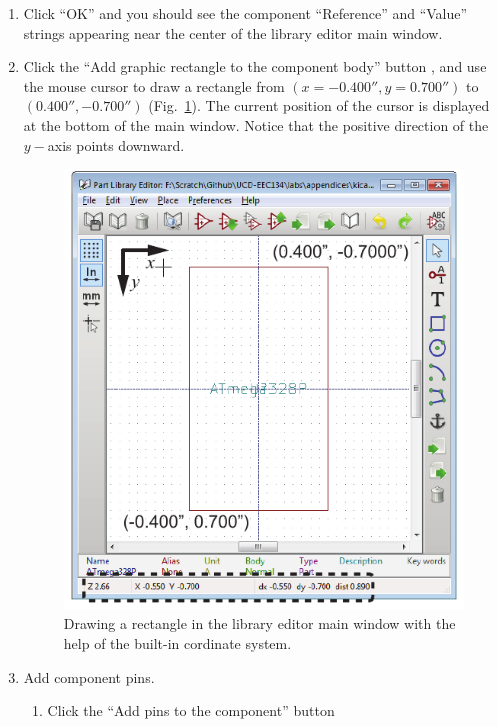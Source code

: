\documentclass[12pt,letterpaper]{scrartcl}
\begin{document}
\begin{enumerate}
	\item Click ``OK'' and you should see the component ``Reference'' and ``Value'' strings appearing near the center of the library editor main window. 
	
	\item Click the ``Add graphic rectangle to the component body'' button , and use the mouse cursor to draw a rectangle from $(x=-0.400'', y=0.700'')$ to $(0.400'',-0.700'')$ (Fig.~\ref{fig:draw-rectangle-symbol}). The current position of the cursor is displayed at the bottom of the main window. Notice that the positive direction of the $y-$axis points downward. 
		\begin{figure}[p]
			\centering
			\includegraphics{draw-rectangle-symbol.pdf}
			\caption{Drawing a rectangle in the library editor main window with the help of the built-in cordinate system.}
			\label{fig:draw-rectangle-symbol}
		\end{figure}
		
	\item Add component pins. 
		\begin{enumerate}
			\item Click the ``Add pins to the component'' button 
			

\end{enumerate}
\end{enumerate}
\end{document}
